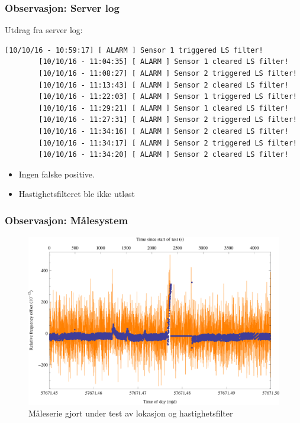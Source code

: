 \documentclass[xcolor=table]{beamer}
\begin{document}
\begin{frame}[fragile]
\frametitle{Observasjon: Server log}
Utdrag fra server log:
      \begin{lstlisting}[basicstyle=\tiny]
        [10/10/16 - 10:59:17] [ ALARM ] Sensor 1 triggered LS filter!
        [10/10/16 - 11:04:35] [ ALARM ] Sensor 1 cleared LS filter!
        [10/10/16 - 11:08:27] [ ALARM ] Sensor 2 triggered LS filter!
        [10/10/16 - 11:13:43] [ ALARM ] Sensor 2 cleared LS filter!
        [10/10/16 - 11:22:03] [ ALARM ] Sensor 1 triggered LS filter!
        [10/10/16 - 11:29:21] [ ALARM ] Sensor 1 cleared LS filter!
        [10/10/16 - 11:27:31] [ ALARM ] Sensor 2 triggered LS filter!
        [10/10/16 - 11:34:16] [ ALARM ] Sensor 2 cleared LS filter!
        [10/10/16 - 11:34:17] [ ALARM ] Sensor 2 triggered LS filter!
        [10/10/16 - 11:34:20] [ ALARM ] Sensor 2 cleared LS filter!
      \end{lstlisting} 
\begin{itemize}
  \item Ingen falske positive.
  \item Hastighetsfilteret ble ikke utløst
\end{itemize}
\end{frame}

\begin{frame}
\frametitle{Observasjon: Målesystem}
      \begin{figure}
        \includegraphics[scale=0.70]{thesis/graphics/cns91-and-csac-telemetry-frequency-1.png}
        \caption{Måleserie gjort under test av lokasjon og hastighetsfilter}
      \end{figure}
\end{frame}
\end{document}
